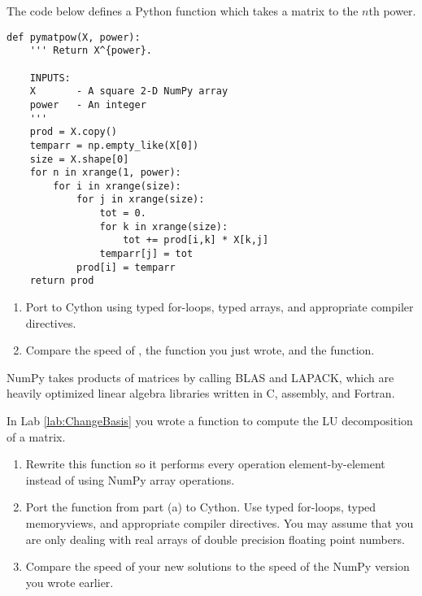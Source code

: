 \begin{problem}
The code below defines a Python function which takes a matrix to the $n$th power.
\begin{lstlisting}
def pymatpow(X, power):
    ''' Return X^{power}.
    
    INPUTS:
    X		- A square 2-D NumPy array
    power	- An integer
    '''
    prod = X.copy()
    temparr = np.empty_like(X[0])
    size = X.shape[0]
    for n in xrange(1, power):
        for i in xrange(size):
            for j in xrange(size):
                tot = 0.
                for k in xrange(size):
                    tot += prod[i,k] * X[k,j]
                temparr[j] = tot
            prod[i] = temparr
    return prod
\end{lstlisting}

\begin{enumerate}
\item Port  to Cython using typed for-loops, typed arrays, and appropriate compiler directives.
\item Compare the speed of , the function you just wrote, and the  function.
\end{enumerate}
NumPy takes products of matrices by calling BLAS and LAPACK, which are heavily optimized linear algebra libraries written in C, assembly, and Fortran.
\end{problem}


\begin{problem}
In Lab \ref{lab:ChangeBasis} you wrote a function to compute the LU decomposition of a matrix.
\begin{enumerate}
\item Rewrite this function so it performs every operation element-by-element instead of using NumPy array operations.
\item Port the function from part (a) to Cython.
Use typed for-loops, typed memoryviews, and appropriate compiler directives.
You may assume that you are only dealing with real arrays of double precision floating point numbers.
\item Compare the speed of your new solutions to the speed of the NumPy version you wrote earlier.
\end{enumerate}
\end{problem}


